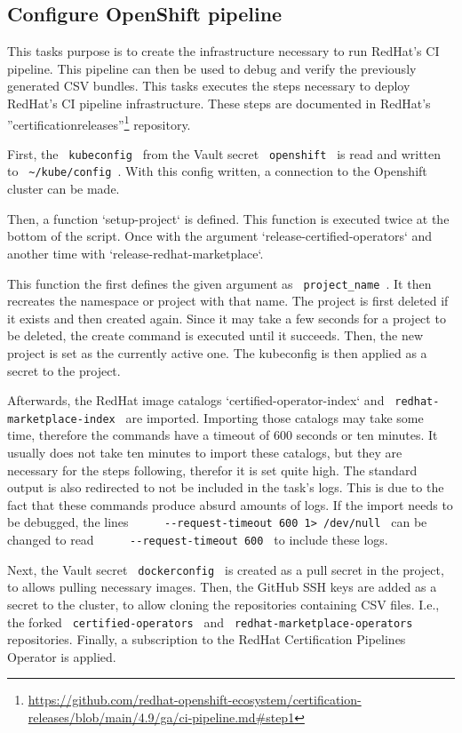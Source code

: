 \subsection{Configure OpenShift pipeline}\label{subsec:configure-openshift-pipeline}

This tasks purpose is to create the infrastructure necessary to run RedHat's CI pipeline.
This pipeline can then be used to debug and verify the previously generated CSV bundles.
This tasks executes the steps necessary to deploy RedHat's CI pipeline infrastructure.
These steps are documented in RedHat's ''certification\-releases''\footnote{\url{https://github.com/redhat-openshift-ecosystem/certification-releases/blob/main/4.9/ga/ci-pipeline.md#step1}} repository.

First, the \verb| kubeconfig | from the Vault secret \verb| openshift | is read and written to \verb| ~/kube/config |.
With this config written, a connection to the Openshift cluster can be made.

Then, a function `setup-project` is defined.
This function is executed twice at the bottom of the script.
Once with the argument `release-certified-operators` and another time with `release-redhat-marketplace`.

This function the first defines the given argument as \verb| project_name |.
It then recreates the namespace or project with that name.
The project is first deleted if it exists and then created again.
Since it may take a few seconds for a project to be deleted, the create command is executed until it succeeds.
Then, the new project is set as the currently active one.
The kubeconfig is then applied as a secret to the project.

Afterwards, the RedHat image catalogs `certified-operator-index` and \verb| redhat-marketplace-index | are imported.
Importing those catalogs may take some time, therefore the commands have a timeout of 600 seconds or ten minutes.
It usually does not take ten minutes to import these catalogs, but they are necessary for the steps following, therefor it is set quite high.
The standard output is also redirected to not be included in the task's logs.
This is due to the fact that these commands produce absurd amounts of logs.
If the import needs to be debugged, the lines \verb|     --request-timeout 600 1> /dev/null | can be changed to read \verb|     --request-timeout 600 | to include these logs.

Next, the Vault secret \verb| dockerconfig | is created as a pull secret in the project, to allows pulling necessary images.
Then, the GitHub SSH keys are added as a secret to the cluster, to allow cloning the repositories containing CSV files.
I.e., the forked \verb| certified-operators | and \verb| redhat-marketplace-operators | repositories.
Finally, a subscription to the RedHat Certification Pipelines Operator is applied.
